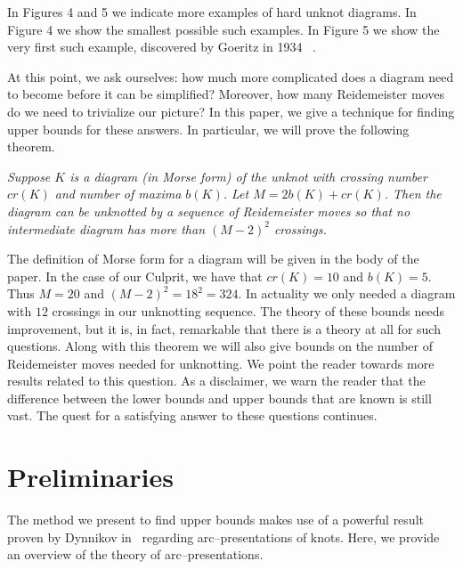 \documentclass{amsart}
\begin{document}
In Figures 4 and 5 we indicate more examples of hard unknot diagrams. In Figure 4 we show the smallest possible such examples. In Figure 5 we show the very first such example, discovered by Goeritz  in 1934 ~\cite{Goeritz}. 
\bigbreak

At this point, we ask ourselves: how much more complicated does a diagram need to become before it can be simplified? Moreover, how many Reidemeister moves do we need to trivialize our picture? In this paper, we give a technique for finding upper bounds for these answers. In particular, we will prove the following theorem.
\bigbreak

{\em Suppose $K$ is a diagram (in Morse form) of the unknot with crossing number $cr(K)$ and number of maxima $b(K)$. Let $M=2b(K)+cr(K)$. Then the diagram can be unknotted by a sequence of Reidemeister moves so that no intermediate diagram has more than $(M-2)^2$ crossings.}
\bigbreak

The definition of Morse form for a diagram will be given in the body of the paper.
In the case of our Culprit, we have  that $cr(K) = 10$ and $b(K) = 5. $ Thus $M = 20$ and 
$(M-2)^2 = 18^{2} = 324.$ In actuality we only needed a diagram with $12$ crossings in our unknotting
sequence. The theory of these bounds needs improvement, but it is, in fact, remarkable that there is a 
theory at all for such questions. Along with this theorem we will also give bounds on the number of 
Reidemeister moves needed for unknotting. We point the reader towards more results related to this question. As a disclaimer, we warn the reader that the difference between the lower bounds and upper bounds that are known is still vast. The quest for a satisfying answer to these questions continues.

\section{Preliminaries}

The method we present to find upper bounds makes use of a powerful result proven by Dynnikov in~\cite{dynnikov} regarding arc--presentations of knots. Here, we provide an overview of the theory of arc--presentations.  
\end{document}
